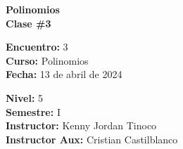 \begin{center} \textbf
{
    \Large Polinomios \\ \vspace{2mm}Clase \#3
}
\end{center}

\begin{multicols}{2}
{
    \textbf{Encuentro:} 3\\
    \textbf{Curso:} Polinomios\\
    \textbf{Fecha:} 13 de abril de 2024\\
    \begin{flushright}
        \textbf{Nivel:} 5\\
        \textbf{Semestre:} I\\
        \textbf{Instructor:} Kenny Jordan Tinoco\\
        \textbf{Instructor Aux:} Cristian Castilblanco
    \end{flushright}
}
\end{multicols}

\thispagestyle{first-page-style}